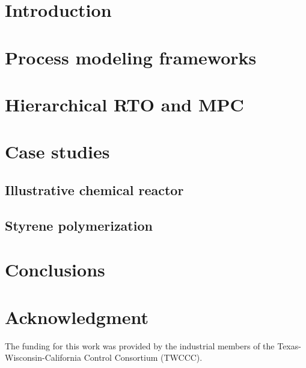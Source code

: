 \documentclass[preprint,5p, twocolumn, authoryear]{elsarticle}
\begin{document}
\section{Introduction} \label{sec:introduction}


\section{Process modeling frameworks} 
\label{sec:process_models}

\section{Hierarchical RTO and MPC} 
\label{sec:rto_mpc}

\section{Case studies} \label{sec:case_study}

\subsection{Illustrative chemical reactor}

\subsection{Styrene polymerization}

\section{Conclusions} \label{sec:conclusions}


\section*{Acknowledgment}
The funding for this work was provided by the industrial members of the
Texas-Wisconsin-California Control Consortium (TWCCC). 



\end{document}
